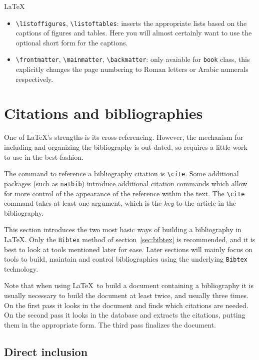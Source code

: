 \begin{chapter}{\LaTeX}
\begin{itemize}
\begin{verbatim}
\section[Additional commands]{Additional commands for long documents}
\end{verbatim}
\item \verb|\listoffigures|, \verb|\listoftables|: inserts the appropriate lists based on the captions of figures and tables. Here you will almost certainly want to use the optional short form for the captions.
\item \verb|\frontmatter|, \verb|\mainmatter|, \verb|\backmatter|: only avaiable for \verb|book| class, this explicitly changes the page numbering to Roman letters or Arabic numerals respectively.
\end{itemize}

\section{Citations and bibliographies}
\label{sec:Citations}

One of \LaTeX's strengths is its cross-referencing. However, the mechanism for including and organizing the bibliography is out-dated, so requires a little work to use in the best fashion.

The command to reference a bibliography citation is \verb|\cite|. Some
additional packages (such as \verb|natbib|) introduce additional
citation commands which allow for more control of the appearance of
the reference within the text. The \verb|\cite| command takes at least
one argument, which is the \emph{key} to the article in the
bibliography.

This section introduces the two most basic ways of building a bibliography in \LaTeX. Only the \verb|Bibtex| method of section~\ref{sec:bibtex} is recommended, and it is best to look at tools mentioned later for ease. Later sections will mainly focus on tools to build, maintain and control bibliographies using the underlying \verb|Bibtex| technology.

Note that when using \LaTeX\ to build a document containing a bibliography it is usually necessary to build the document at least twice, and usually three times. On the first pass it looks in the document and finds which citations are needed. On the second pass it looks in the database and extracts the citations, putting them in the appropriate form. The third pass finalizes the document.

\subsection{Direct inclusion}
\label{sec:Direct}


\end{chapter}
